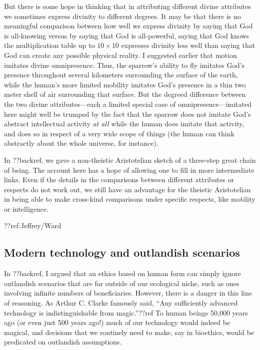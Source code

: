 But there is some hope in thinking that in attributing different divine attributes we sometimes express divinity
to different degrees. It may be that there is no meaningful comparison between how well we express divinity by
saying that God is all-knowing versus by saying that God is all-powerful, saying that God knows the
multiplication table up to $10\times 10$ expresses divinity less well than saying that God can create any
possible physical reality. I suggested earlier that motion imitates divine omnipresence. Thus, the sparrow's
ability to fly imitates God's presence throughout several kilometers surrounding the surface of the earth, while
the human's more limited mobility imitates God's presence in a thin two meter shell of air surrounding that surface.
But the degreed difference between the two divine attributes---each a limited special case of omnipresence---imitated here 
might well be trumped by the fact that the sparrow does not imitate God's abstract intellectual activity \textit{at all}
while the human does imitate that activity, and does so in respect of a very wide scope of things (the human can think
abstractly about the whole universe, for instance). 

In ??backref, we gave a non-theistic Aristotelian sketch of a three-step great chain of being. The account here has
a hope of allowing one to fill in more intermediate links.
Even if the details in the comparisons between different attributes or respects do not work out, we still have an advantage 
for the theistic Aristotelian in being able to make cross-kind comparisons under specific respects, like motility or intelligence.

??ref:Jeffrey/Ward

\subsection{Modern technology and outlandish scenarios}
In ??backref, I argued that an ethics based on human form can simply ignore outlandish scenarios
that are far outside of our ecological niche, such as ones involving infinite numbers of
beneficiaries. However, there is a danger in this line of reasoning. As Arthur C. Clarke famously
said, ``Any sufficiently advanced technology is indistinguishable from magic.''??ref To human beings
50,000 years ago (or even just 500 years ago!) much of our technology would indeed be magical, and 
decisions that we routinely need to make, say in bioethics, would be predicated on outlandish assumptions. 

